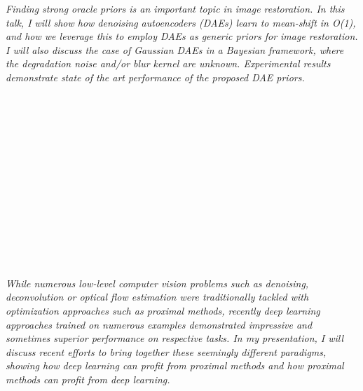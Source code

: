\begin{multicols}{2}
\\ 
        \\
        \\\\
\\
      \textit{Finding strong oracle priors is an important topic in image restoration. In this talk, I will show how denoising autoencoders (DAEs) learn to mean-shift in O(1), and how we leverage this to employ DAEs as  generic priors for image restoration. I will also discuss the case of Gaussian DAEs in a Bayesian framework, where the degradation noise and/or blur kernel are unknown. Experimental results demonstrate state of the art performance of the proposed DAE priors.}\\
\\ 
        \\
        \\\\
        \\
        \\\\
        \\
        \\\\
        \\
        \\\\
\\
      \textit{While numerous low-level computer vision problems such as denoising, deconvolution or optical flow estimation were traditionally tackled with optimization approaches such as proximal methods, recently deep learning approaches trained on numerous examples demonstrated impressive and sometimes superior performance on respective tasks.
In my presentation, I will discuss recent efforts to bring together these seemingly different paradigms, showing how deep learning
can profit from proximal methods and how proximal methods can profit from deep learning.}\\
\\ 
        \\
        \\\\
        \\
        \\\\

\end{multicols}
